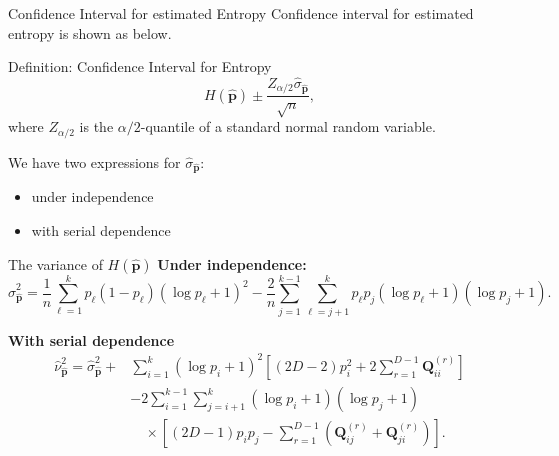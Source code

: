 \documentclass{beamer}
\begin{document}

\begin{frame}{Confidence Interval for estimated Entropy}
	Confidence interval for estimated entropy is shown as below.
	\begin{block}{Definition: Confidence Interval for Entropy}
			\[
			H(\widehat{\mathbf{p}})\pm \dfrac{Z_{\alpha/2}\widehat{\sigma}_{\widehat{\mathbf{p}}}}{\sqrt{n}},
				\label{eq:ConfidenceInterval}
			\]
			where $Z_{\alpha/2}$ is the $\alpha/2$-quantile of a standard normal random variable.
			\end{block} 
We have two expressions for $\widehat{\sigma}_{\widehat{\mathbf{p}}}$:
\begin{itemize}
	\item under independence
	\item with serial dependence
\end{itemize}
\end{frame}

\begin{frame}{The variance of $H(\widehat{\mathbf p})$}
\textbf{Under independence:}
$$
\widehat{\sigma}^2_{\widehat{\mathbf{p}}} = \dfrac{1}{n}\sum_{\ell=1}^{k}p_\ell(1-p_\ell)(\log p_\ell+1)^2-\dfrac{2}{n}\sum_{j=1}^{k-1}\sum_{\ell=j+1}^{k}p_\ell p_j(\log p_\ell+1)(\log p_j+1).
$$

\textbf{With serial dependence}
\[ \begin{split}
\widehat{\nu}^2_{\widehat{\mathbf{p}}} = \widehat{\sigma}^2_{\widehat{\mathbf{p}}} + 
	 & \sum_{i=1}^{k}(\log p_i + 1)^2 
	\left[ (2D - 2)p_i^2 + 2\sum_{r=1}^{D-1} \mathbf{Q}^{(r)}_{ii} \right] \\
	& - 2 \sum_{i=1}^{k-1} \sum_{j=i+1}^{k} (\log p_i + 1)(\log p_j + 1) \\
	& \quad \times \left[ (2D - 1)p_i p_j - \sum_{r=1}^{D-1} \left( \mathbf{Q}^{(r)}_{ij} + \mathbf{Q}^{(r)}_{ji} \right) \right].
\end{split}
\]

\end{frame}
\end{document}
